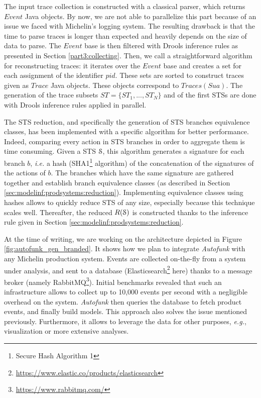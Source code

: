 The input trace collection is constructed with a classical
parser, which returns $Event$ Java objects. By now, we are not
able to parallelize this part because of an issue we faced with
Michelin's logging system. The resulting drawback is that the
time to parse traces is longer than expected and heavily depends
on the size of data to parse. The $Event$ base is then filtered
with Drools inference rules as presented in Section
\ref{part3:collecting}.  Then, we call a straightforward
algorithm for reconstructing traces: it iterates over the $Event$
base and creates a set for each assignment of the identifier
$pid$. These sets are sorted to construct traces given as $Trace$
Java objects. These objects correspond to $Traces(Sua)$. The
generation of the trace subsets $ST= \{ST_1,...,ST_N\}$ and of
the first STSs are done with Drools inference rules applied in
parallel.

The STS reduction, and specifically the generation
of STS branches equivalence classes, has been implemented with a
specific algorithm for better performance. Indeed, comparing
every action in STS branches in order to aggregate them is time
consuming.  Given a STS $\EuScript{S}$, this algorithm generates
a signature for each branch $b$, \emph{i.e.} a hash
(SHA1\footnote{Secure Hash Algorithm 1} algorithm) of
the concatenation of the signatures of the actions of $b$. The
branches which have the same signature are gathered together and
establish branch equivalence classes (as described in Section
\ref{sec:modelinf:prodsystems:reduction}). Implementing
equivalence classes using hashes allows to quickly reduce STS of
any size, especially because this technique scales well.
Thereafter, the reduced $R(\EuScript{S})$ is constructed thanks
to the inference rule given in Section
\ref{sec:modelinf:prodsystems:reduction}.

At the time of writing, we are working on the architecture
depicted in Figure \ref{fig:autofunk_gen_branded}. It shows how
we plan to integrate \textit{Autofunk} with any Michelin
production system.  Events are collected on-the-fly from a system
under analysis, and sent to a database
(Elasticsearch\footnote{\url{https://www.elastic.co/products/elasticsearch}}
here) thanks to a message broker (namely
RabbitMQ\footnote{\url{https://www.rabbitmq.com/}}). Initial
benchmarks revealed that such an infrastructure allows to collect
up to 10,000 events per second with a negligible overhead on the
system. \textit{Autofunk} then queries the database to fetch
product events, and finally build models. This approach also
solves the issue mentioned previously. Furthermore, it allows to
leverage the data for other purposes, \emph{e.g.}, visualization or more
extensive analyses.

